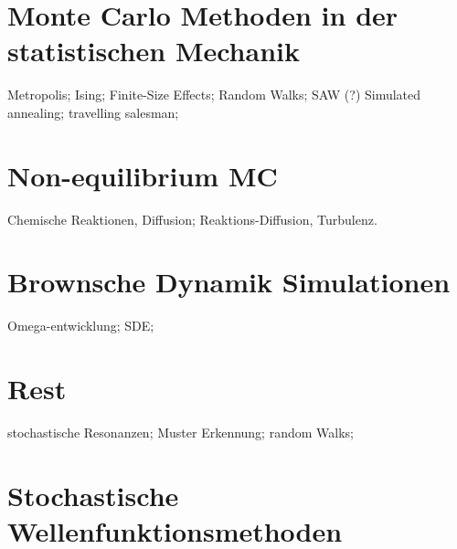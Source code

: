 \chapter{Monte Carlo Methoden in der statistischen Mechanik}
Metropolis; Ising; Finite-Size Effects; Random Walks; SAW (?)
Simulated annealing; travelling salesman;

\chapter{Non-equilibrium MC}
Chemische Reaktionen, Diffusion; Reaktions-Diffusion, Turbulenz.

\chapter{Brownsche Dynamik Simulationen}
Omega-entwicklung; SDE;


\chapter{Rest}
stochastische Resonanzen; Muster Erkennung; random Walks;

\chapter{Stochastische Wellenfunktionsmethoden}
